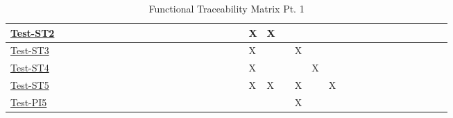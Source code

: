\documentclass[12pt, titlepage]{article}
\begin{document}
\begin{landscape}
\begin{table}[H]
\begin{adjustwidth}{-0.1in}{-1in}
{\begin{tabular}{|c|c|c|c|c|c|c|c|c|c|c|c|c|c|c|c|c|l|l|l|l|l|l|l|l|l|l|l|l|l|l|l|l|l|l|l|l|}
\multicolumn{1}{|l|}{\hyperref[itm:Test-ST2]{Test-ST2}}   &              &              &              &              &              &              &              &             &             &             &              &              &              &              &              &                & & & & X& X& & & &\\ \hline
\multicolumn{1}{|l|}{\hyperref[itm:Test-ST3]{Test-ST3}}   &             &              &             &              &              &              &              &             &              &              &              &              &              &              &              &                & & & & X& & & X& &\\ \hline
\multicolumn{1}{|l|}{\hyperref[itm:Test-ST4]{Test-ST4}}   &             &             &             &             &             &             &             &             &              &              &             &             &              &             &              &                & & & & X& & & & X&\\ \hline
\multicolumn{1}{|l|}{\hyperref[itm:Test-ST5]{Test-ST5}}   &              &              &             &              &             &             &             &             &              &              &             &             &              &              &              &                & & & & X& X& & X& & X\\ \hline
\multicolumn{1}{|l|}{\hyperref[itm:Test-PI5]{Test-PI5}}   &              &              &             &              &             &             &             &             &              &              &             &             &              &              &              &                & & & & & & &X & & \\ \hline


\end{tabular}

}
\caption{Functional Traceability Matrix Pt. 1}
    \label{tab:matrix1}
\end{adjustwidth}
\end{table}


\end{landscape}
\end{document}
